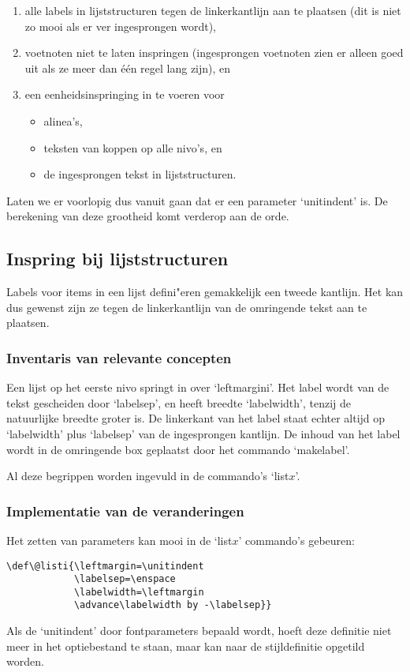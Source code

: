 \documentclass[oldtoc,a4paper,10pt]{rapport3}
\begin{document}
\begin{enumerate}
\item alle labels in lijststructuren tegen de linkerkantlijn aan te
  plaatsen (dit is niet zo mooi als er ver ingesprongen wordt),
\item voetnoten niet te laten inspringen (ingesprongen voetnoten zien
  er alleen goed uit als ze meer dan \'e\'en regel lang zijn), en
\item een eenheidsinspringing in te voeren voor
 \begin{itemize}
 \item alinea's,
 \item teksten van koppen op alle nivo's, en
 \item de ingesprongen tekst in lijststructuren.
 \end{itemize}
\end{enumerate}
Laten we er voorlopig dus vanuit gaan dat er een parameter
`unitindent' is. De berekening van deze grootheid komt verderop aan de
orde.
 
\subsection{Inspring bij lijststructuren}
 
Labels voor items in een lijst defini"eren gemakkelijk een tweede
kantlijn. Het kan dus gewenst zijn ze tegen de linkerkantlijn van de
omringende tekst aan te plaatsen.
 
\subsubsection{Inventaris van relevante concepten}
Een lijst op het eerste nivo springt in over `leftmargini'.  Het label
wordt van de tekst gescheiden door `labelsep', en heeft breedte
`labelwidth', tenzij de natuurlijke breedte groter is.  De linkerkant
van het label staat echter altijd op `labelwidth' plus `labelsep' van
de ingesprongen kantlijn.  De inhoud van het label wordt in de
omringende box geplaatst door het commando `makelabel'.
 
Al deze begrippen worden ingevuld in de commando's `list$x$'.
 
\subsubsection{Implementatie van de veranderingen}
Het zetten van parameters kan mooi in de `list$x$' commando's
gebeuren:
\begin{verbatim}
\def\@listi{\leftmargin=\unitindent
            \labelsep=\enspace
            \labelwidth=\leftmargin
            \advance\labelwidth by -\labelsep}}
\end{verbatim}
Als de `unitindent' door fontparameters bepaald wordt, hoeft deze
definitie niet meer in het optiebestand te staan, maar kan naar de
stijldefinitie opgetild worden.
 
\end{document}
